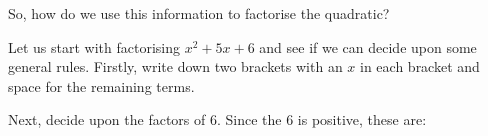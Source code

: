       \label{m39394*id275901}So, how do we use this information to factorise the quadratic?\par 
      \label{m39394*id275905}Let us start with factorising ${x}^{2}+5x+6$ \hspace{1ex}and see if we can decide upon some general rules. Firstly, write down two brackets with an $x$ in each bracket and space for the remaining terms.\par 
      \label{m39394*id275944}\nopagebreak\noindent{}
      \label{m39394*id275980}Next, decide upon the factors of 6. Since the 6 is positive, these are:\par 
